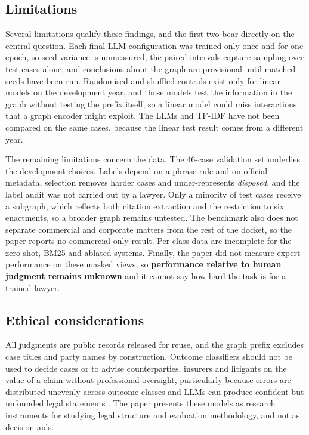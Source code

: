 \documentclass[journal]{IEEEtran}
\newcommand{\cls}[1]{\emph{#1}}
\begin{document}
\subsection{Limitations}\label{sec:limits}
Several limitations qualify these findings, and the first two bear directly on the central question. Each final LLM configuration was trained only once and for one epoch, so seed variance is unmeasured, the paired intervals capture sampling over test cases alone, and conclusions about the graph are provisional until matched seeds have been run. Randomised and shuffled controls exist only for linear models on the development year, and those models test the information in the graph without testing the prefix itself, so a linear model could miss interactions that a graph encoder might exploit. The LLMs and TF-IDF have not been compared on the same cases, because the linear test result comes from a different year.

The remaining limitations concern the data. The 46-case validation set underlies the development choices. Labels depend on a phrase rule and on official metadata, selection removes harder cases and under-represents \cls{disposed}, and the label audit was not carried out by a lawyer. Only a minority of test cases receive a subgraph, which reflects both citation extraction and the restriction to six enactments, so a broader graph remains untested. The benchmark also does not separate commercial and corporate matters from the rest of the docket, so the paper reports no commercial-only result. Per-class data are incomplete for the zero-shot, BM25 and ablated systems. Finally, the paper did not measure expert performance on these masked views, so \textbf{performance relative to human judgment remains unknown} and it cannot say how hard the task is for a trained lawyer.

\subsection{Ethical considerations}
All judgments are public records released for reuse, and the graph prefix excludes case titles and party names by construction. Outcome classifiers should not be used to decide cases or to advise counterparties, insurers and litigants on the value of a claim without professional oversight, particularly because errors are distributed unevenly across outcome classes and LLMs can produce confident but unfounded legal statements \cite{r51}. The paper presents these models as research instruments for studying legal structure and evaluation methodology, and not as decision aids.
\end{document}
